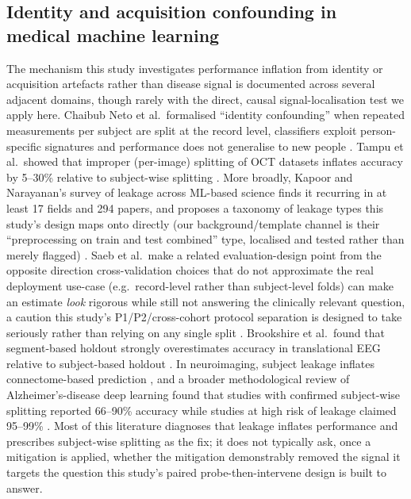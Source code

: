 \documentclass[3p,final,10pt]{elsarticle}
\let\oldsubsection\subsection
\renewcommand{\subsection}{\FloatBarrier\oldsubsection}
\begin{document}
\subsection{Identity and acquisition confounding in medical machine learning}
The mechanism this study investigates performance inflation from
identity or acquisition artefacts rather than disease signal is
documented across several adjacent domains, though rarely with the direct,
causal signal-localisation test we apply here. Chaibub Neto et al.\
formalised ``identity confounding'' when repeated measurements per
subject are split at the record level, classifiers exploit person-specific
signatures and performance does not generalise to new people
\cite{chaibubneto2019}. Tampu et al.\ showed that improper (per-image)
splitting of OCT datasets inflates accuracy by 5--30\% relative to
subject-wise splitting \cite{tampu2022}. More broadly, Kapoor and
Narayanan's survey of leakage across ML-based science finds it recurring
in at least 17 fields and 294 papers, and proposes a taxonomy of leakage
types this study's design maps onto directly (our background/template
channel is their ``preprocessing on train and test combined'' type,
localised and tested rather than merely flagged) \cite{kapoor2023}. Saeb
et al.\ make a related evaluation-design point from the opposite
direction cross-validation choices that do not approximate the real
deployment use-case (e.g.\ record-level rather than subject-level folds)
can make an estimate \emph{look} rigorous while still not answering the
clinically relevant question, a caution this study's P1/P2/cross-cohort
protocol separation is designed to take seriously rather than relying on
any single split \cite{saeb2017}. Brookshire et al.\ found that
segment-based holdout strongly overestimates accuracy in translational EEG
relative to subject-based holdout \cite{brookshire2024}. In neuroimaging,
subject leakage inflates connectome-based prediction \cite{rosenblatt2024},
and a broader methodological review of Alzheimer's-disease deep learning
found that studies with confirmed subject-wise splitting reported 66--90\%
accuracy while studies at high risk of leakage claimed 95--99\%
\cite{wen2020,alzheimerscoping2025}. Most of this literature diagnoses
that leakage inflates performance and prescribes subject-wise
splitting as the fix; it does not typically ask, once a mitigation is
applied, whether the mitigation demonstrably removed the signal it targets the question this study's paired probe-then-intervene design is built to
answer.
\end{document}
